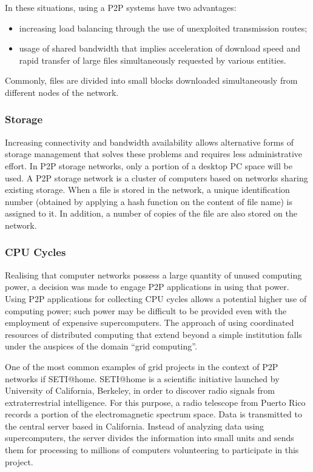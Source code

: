 In these situations, using a P2P systems have two advantages:
\begin{itemize}
  \item increasing load balancing through the use of unexploited transmission
  routes;
  \item usage of shared bandwidth that implies acceleration of download speed
  and rapid transfer of large files simultaneously requested by various
  entities.
\end{itemize}

Commonly, files are divided into small blocks downloaded simultaneously from
different nodes of the network.

\subsubsection{Storage}

Increasing connectivity and bandwidth availability allows alternative forms of
storage management that solves these problems and requires less administrative
effort. In P2P storage networks, only a portion of a desktop PC space will be
used. A P2P storage network is a cluster of computers based on networks sharing
existing storage. When a file is stored in the network, a unique identification
number (obtained by applying a hash function on the content of file name) is
assigned to it. In addition, a number of copies of the file are also stored on
the network.

\subsubsection{CPU Cycles}

Realising that computer networks possess a large quantity of unused computing
power, a decision was made to engage P2P applications in using that power.
Using P2P applications for collecting CPU cycles allows a potential higher use
of computing power; such power may be difficult to be provided even with the
employment of expensive supercomputers. The approach of using coordinated
resources of distributed computing that extend beyond a simple institution
falls under the auspices of the domain ``grid computing''.

One of the most common examples of grid projects in the context of P2P networks
if SETI@home. SETI@home is a scientific initiative launched by University of
California, Berkeley, in order to discover radio signals from extraterrestrial
intelligence. For this purpose, a radio telescope from Puerto Rico records a
portion of the electromagnetic spectrum space. Data is transmitted to the
central server based in California. Instead of analyzing data using
supercomputers, the server divides the information into small units and sends
them for processing to millions of computers volunteering to participate in
this project.

